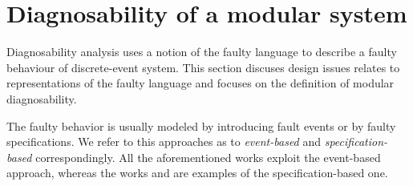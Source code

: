 \documentclass[a4paper, 10pt, conference]{ieeeconf} \IEEEoverridecommandlockouts
\begin{document}
% 
% 

\section{Diagnosability of a modular system}
\label{sec:Diagnosability}
Diagnosability analysis uses a notion of the faulty language to describe a
faulty behaviour of discrete-event system. This section discuses design issues
relates to representations of the faulty language and focuses on the definition
of modular diagnosability.

The faulty behavior is usually modeled by introducing fault events or by faulty
specifications. We refer to this approaches as to \emph{event-based} and
\emph{specification-based} correspondingly. All the aforementioned works exploit
the event-based approach, whereas the works \cite{zhou_decentralized_2008} and
\cite{sartini_methodology_2010} are examples of the specification-based one.
\end{document}
